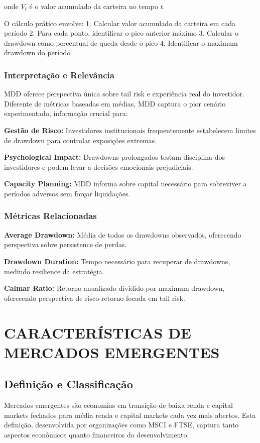 onde $V_t$ é o valor acumulado da carteira no tempo $t$.

O cálculo prático envolve:
1. Calcular valor acumulado da carteira em cada período
2. Para cada ponto, identificar o pico anterior máximo
3. Calcular o drawdown como percentual de queda desde o pico
4. Identificar o maximum drawdown do período

\subsubsection{Interpretação e Relevância}

MDD oferece perspectiva única sobre tail risk e experiência real do investidor. Diferente de métricas baseadas em médias, MDD captura o pior cenário experimentado, informação crucial para:

\textbf{Gestão de Risco:} Investidores institucionais frequentemente estabelecem limites de drawdown para controlar exposições extremas.

\textbf{Psychological Impact:} Drawdowns prolongados testam disciplina dos investidores e podem levar a decisões emocionais prejudiciais.

\textbf{Capacity Planning:} MDD informa sobre capital necessário para sobreviver a períodos adversos sem forçar liquidações.

\subsubsection{Métricas Relacionadas}

\textbf{Average Drawdown:} Média de todos os drawdowns observados, oferecendo perspectiva sobre persistence de perdas.

\textbf{Drawdown Duration:} Tempo necessário para recuperar de drawdowns, medindo resilience da estratégia.

\textbf{Calmar Ratio:} Retorno anualizado dividido por maximum drawdown, oferecendo perspectiva de risco-retorno focada em tail risk.

\section{CARACTERÍSTICAS DE MERCADOS EMERGENTES}

\subsection{Definição e Classificação}

Mercados emergentes são economias em transição de baixa renda e capital markets fechados para média renda e capital markets cada vez mais abertos. Esta definição, desenvolvida por organizações como MSCI e FTSE, captura tanto aspectos econômicos quanto financeiros do desenvolvimento.

